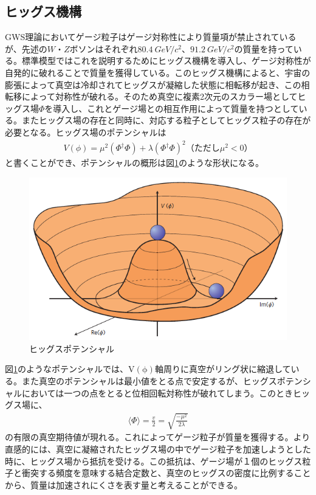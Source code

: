 \subsection{ヒッグス機構}
GWS理論においてゲージ粒子はゲージ対称性により質量項が禁止されているが、先述の$W$・$Z$ボソンはそれぞれ$\SI{80.4}{GeV/c^2}$、$\SI{91.2}{GeV/c^2}$の質量を持っている。標準模型ではこれを説明するためにヒッグス機構を導入し、ゲージ対称性が自発的に破れることで質量を獲得している。このヒッグス機構によると、宇宙の膨張によって真空は冷却されてヒッグスが凝縮した状態に相転移が起き、この相転移によって対称性が破れる。そのため真空に複素2次元のスカラー場としてヒッグス場$\Phi$を導入し、これとゲージ場との相互作用によって質量を持つとしている。またヒッグス場の存在と同時に、対応する粒子としてヒッグス粒子の存在が必要となる。ヒッグス場のポテンシャル\cite{gaugehiggs}は
\begin{align}
V(\phi) = {\mu}^2({\Phi}^\dag \Phi) + \lambda ({\Phi}^\dag \Phi)^2　（ただし{\mu}^2 < 0）
\end{align}
と書くことができ、ポテンシャルの概形は図\ref{higgspotential}のような形状になる。
\begin{figure}[H]
	\begin{center}
 \includegraphics[keepaspectratio, scale=0.3]
 	{Figure/Introduction/higgspotential.png}
 		\caption{ヒッグスポテンシャル\cite{higgspotential}}
 		\label{higgspotential}
	\end{center}
\end{figure}

図\ref{higgspotential}のようなポテンシャルでは、$\mathrm{V(\phi)}$軸周りに真空がリング状に縮退している。また真空のポテンシャルは最小値をとる点で安定するが、ヒッグスポテンシャルにおいては一つの点をとると位相回転対称性が破れてしまう。このときヒッグス場に、
\begin{align}
\label{higgsvalue}
\langle \Phi \rangle = \frac{v}{2} = \sqrt{\frac{-{\mu}^2}{2\lambda}}
\end{align}
の有限の真空期待値が現れる。これによってゲージ粒子が質量を獲得する。より直感的には、真空に凝縮されたヒッグス場の中でゲージ粒子を加速しようとした時に、ヒッグス場から抵抗を受ける。この抵抗は、ゲージ場が１個のヒッグス粒子と衝突する頻度を意味する結合定数と、真空のヒッグスの密度に比例することから、質量は加速されにくさを表す量と考えることができる。

